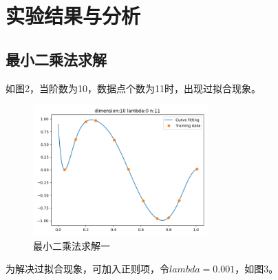 \documentclass[a4paper,11pt,UTF8]{ctexart}
\newcommand{\bottomcaption}{%
\setlength{\abovecaptionskip}{6pt}%
\setlength{\belowcaptionskip}{6pt}%
\caption}
\begin{document}
\section{实验结果与分析}

\subsection{最小二乘法求解}
如图2，当阶数为10，数据点个数为11时，出现过拟合现象。
\begin{figure}[htbp]
	\centering
	\includegraphics[width=0.6\textwidth]{1_1.png}
	\bottomcaption{最小二乘法求解一}
\end{figure}
为解决过拟合现象，可加入正则项，令$lambda = 0.001$，如图3。
\end{document}
